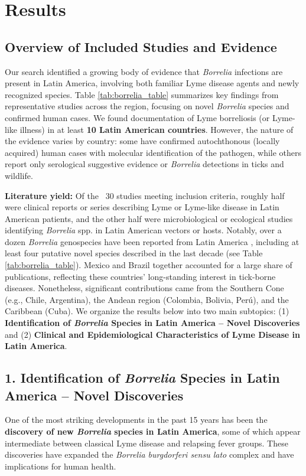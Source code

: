 \documentclass[11pt,letterpaper]{article}
\begin{document}
\section{Results}
\subsection{Overview of Included Studies and Evidence}
Our search identified a growing body of evidence that \textit{Borrelia} infections are present in Latin America, involving both familiar Lyme disease agents and newly recognized species. Table \ref{tab:borrelia_table} summarizes key findings from representative studies across the region, focusing on novel \textit{Borrelia} species and confirmed human cases. We found documentation of Lyme borreliosis (or Lyme-like illness) in at least \textbf{10 Latin American countries}. However, the nature of the evidence varies by country: some have confirmed autochthonous (locally acquired) human cases with molecular identification of the pathogen, while others report only serological suggestive evidence or \textit{Borrelia} detections in ticks and wildlife.

\textbf{Literature yield:} Of the ~30 studies meeting inclusion criteria, roughly half were clinical reports or series describing Lyme or Lyme-like disease in Latin American patients, and the other half were microbiological or ecological studies identifying \textit{Borrelia} spp. in Latin American vectors or hosts. Notably, over a dozen \textit{Borrelia} genospecies have been reported from Latin America \citep{Colunga-Salas2020a}, including at least four putative novel species described in the last decade (see Table \ref{tab:borrelia_table}). Mexico and Brazil together accounted for a large share of publications, reflecting these countries' long-standing interest in tick-borne diseases. Nonetheless, significant contributions came from the Southern Cone (e.g., Chile, Argentina), the Andean region (Colombia, Bolivia, Perú), and the Caribbean (Cuba). We organize the results below into two main subtopics: (1) \textbf{Identification of \textit{Borrelia} Species in Latin America – Novel Discoveries} and (2) \textbf{Clinical and Epidemiological Characteristics of Lyme Disease in Latin America}.

\subsection{1. Identification of \textit{Borrelia} Species in Latin America – Novel Discoveries}
One of the most striking developments in the past 15 years has been the \textbf{discovery of new \textit{Borrelia} species in Latin America}, some of which appear intermediate between classical Lyme disease and relapsing fever groups. These discoveries have expanded the \textit{Borrelia burgdorferi sensu lato} complex and have implications for human health.
\end{document}

